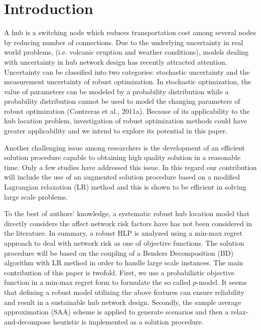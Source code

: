 \documentclass[review]{elsarticle}
\begin{document}

\section{Introduction}\label{se1}

A hub is a switching node which reduces transportation cost among several nodes by reducing number of connections. Due to the underlying uncertainty in real world problems, (i.e. volcanic eruption and weather conditions), models dealing with uncertainty in hub network design has recently attracted attention. Uncertainty can be classified into two categories: stochastic uncertainty and the measurement uncertainty of robust optimization. In stochastic optimization, the value of parameters can be modeled by a probability distribution while a probability distribution cannot be used to model the changing parameters of robust optimization (Contreras et al., 2011a). Because of its applicability to the hub location problem, investigation of robust optimization methods could have greater applicability and we intend to explore its potential in this paper. 

Another challenging issue among researchers is the development of an efficient solution procedure capable to obtaining high quality solution in a reasonable time. Only a few studies have addressed this issue. In this regard our contribution will include the use of an augmented solution procedure based on a modified Lagrangian relaxation (LR) method and this is shown to be efficient in solving large scale problems. 

To the best of authors' knowledge, a systematic robust hub location model that directly considers the affect network risk factors have has not been considered in the literature. In summary, a robust HLP is analyzed using a min-max regret approach to deal with network risk as one of objective functions. The solution procedure will be based on the coupling of a Benders Decomposition (BD) algorithm with LR method in order to handle large scale instances. The main contribution of this paper is twofold. First, we use a probabilistic objective function in a min-max regret form to formulate the so called $p$-model. It seems that defining a robust model utilizing the above features can ensure reliability and result in a sustainable hub network design. Secondly, the sample average approximation (SAA) scheme is applied to generate scenarios and then a relax-and-decompose heuristic is implemented as a solution procedure.
\end{document}

